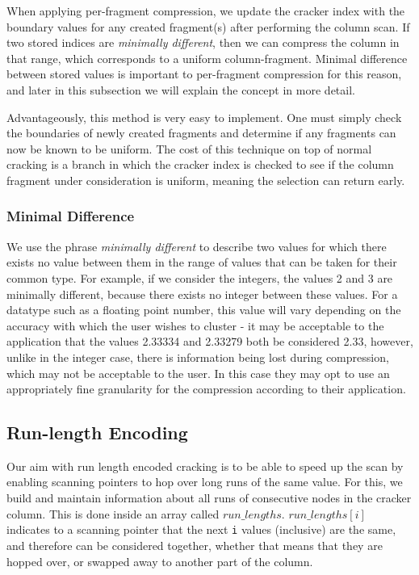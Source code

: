 \label{ss:perfrag}

When applying per-fragment compression, we update the cracker index with the boundary values for any created fragment(s) after performing the column scan. If two stored indices are \textit{minimally different}, then we can compress the column in that range, which corresponds to a uniform column-fragment. Minimal difference between stored values is important to per-fragment compression for this reason, and later in this subsection we will explain the concept in more detail.

Advantageously, this method is very easy to implement. One must simply check the boundaries of newly created fragments and determine if any fragments can now be known to be uniform. The cost of this technique on top of normal cracking is a branch in which the cracker index is checked to see if the column fragment under consideration is uniform, meaning the selection can return early.

\subsubsection{Minimal Difference}

We use the phrase \textit{minimally different} to describe two values for which there exists no value between them in the range of values that can be taken for their common type. For example, if we consider the integers, the values 2 and 3 are minimally different, because there exists no integer between these values. For a datatype such as a floating point number, this value will vary depending on the accuracy with which the user wishes to cluster - it may be acceptable to the application that the values 2.33334 and 2.33279 both be considered 2.33, however, unlike in the integer case, there is information being lost during compression, which may not be acceptable to the user. In this case they may opt to use an appropriately fine granularity for the compression according to their application.

\subsection{Run-length Encoding}

Our aim with run length encoded cracking is to be able to speed up the scan by enabling scanning pointers to hop over long runs of the same value. For this, we build and maintain information about all runs of consecutive nodes in the cracker column. This is done inside an array called $run\_lengths$. $run\_lengths[i]$ indicates to a scanning pointer that the next \texttt{i} values (inclusive) are the same, and therefore can be considered together, whether that means that they are hopped over, or swapped away to another part of the column.


